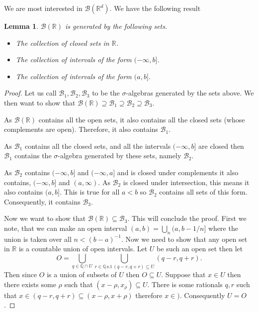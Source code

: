 \documentclass[11pt]{article}
\newtheorem{lem}[thm]{Lemma}
\theoremstyle{definition}
\theoremstyle{remark}
\begin{document}
We are most interested in $\mathcal{B}(\mathbb{R}^d)$. We have the following result
\begin{lem}
$\mathcal{B}(\mathbb{R})$ is generated by the following sets.
\begin{itemize}
\item The collection of closed sets in $\mathbb{R}$.
\item The collection of intervals of the form $(-\infty, b]$.
\item The collection of intervals of the form $(a,b]$.
\end{itemize}
\end{lem}
\begin{proof}
Let us call $\mathcal{B}_1, \mathcal{B}_2, \mathcal{B}_3$ to be the $\sigma$-algebras generated by the sets above. We then want to show that $\mathcal{B}(\mathbb{R}) \supseteq \mathcal{B}_1 \supseteq \mathcal{B}_2 \supseteq \mathcal{B}_3$. 

As $\mathcal{B}(\mathbb{R})$ contains all the open sets, it also contains all the closed sets (whose complements are open). Therefore, it also contains $\mathcal{B}_1$. 

As $\mathcal{B}_1$ contains all the closed sets, and all the intervals $(-\infty, b]$ are closed then $\mathcal{B}_1$ contains the $\sigma$-algebra generated by these sets, namely $\mathcal{B}_2$.

As $\mathcal{B}_2$ contains $(-\infty, b]$ and $(-\infty, a]$ and is closed under complements it also contains, $(-\infty, b]$ and $(a, \infty)$. As $\mathcal{B}_2$ is closed under intersection, this means it also contains $(a,b]$. This is true for all $a<b$ so $\mathcal{B}_2$ contains all sets of this form. Consequently, it contains $\mathcal{B}_3$.

Now we want to show that $\mathcal{B}(\mathbb{R}) \subseteq \mathcal{B}_3$. This will conclude the proof. First we note, that we can make an open interval $(a,b) = \bigcup_n (a, b-1/n]$ where the union is taken over all $n < (b-a)^{-1}$. Now we need to show that any open set in $\mathbb{R}$ is a countable union of open intervals. Let $U$ be such an open set then let 
\[ O = \bigcup_{q \in \mathbb{Q} \cap U} \bigcup_{r \in \mathbb{Q} \, \mbox{s.t} \, (q-r,q+r) \subseteq U} (q-r,q+r). \] Then since $O$ is a union of subsets of $U$ then $O \subseteq U$. Suppose that $x \in U$ then there exists some $\rho$ such that $(x-\rho, x_\rho) \subseteq U$. There is some rationals $q,r$ such that $x \in (q-r,q+r) \subseteq (x-\rho,x+\rho)$ therefore $x \in )$. Consequently $U= O$. 
\end{proof}
\end{document}
